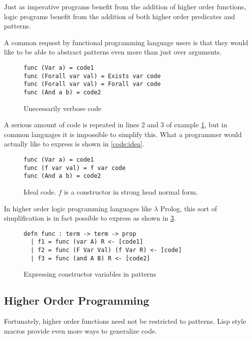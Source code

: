 Just as imperative programs benefit from the addition of higher order functions, logic programs benefit from the addition of both
higher order predicates and patterns.  

A common request by functional programming language users is that they would like to be able to abstract patterns even more than just over
arguments.  

\begin{figure}[h]
\begin{lstlisting}
func (Var a) = code1
func (Forall var val) = Exists var code
func (Forall var val) = Forall var code
func (And a b) = code2
\end{lstlisting}
\caption{Unecessarily verbose code}
\label{code:verbose}
\end{figure}

A serious amount of code is repeated in lines 2 and 3 of example \ref{code:verbose}, 
but in common languages it is impossible to simplify this.
What a programmer would actually like to express is shown in \ref{code:idea}.

\begin{figure}[h]
\begin{lstlisting}
func (Var a) = code1
func (f var val) = f var code
func (And a b) = code2
\end{lstlisting}
\caption{Ideal code. $f$ is a constructor in strong head normal form.}
\label{code:ideal}
\end{figure}

In higher order logic programming languages like $\lambda$ Prolog, this sort of simplification 
is in fact possible to express as shown in \ref{code:lprolog}.

\begin{figure}[h]
\begin{lstlisting}
defn func : term -> term -> prop 
  | f1 = func (var A) R <- [code1]
  | f2 = func (F Var Val) (f Var R) <- [code]
  | f3 = func (and A B) R <- [code2]
\end{lstlisting}
\caption{Expressing constructor variables in patterns}
\label{code:lprolog}
\end{figure}


\subsection{Higher Order Programming}

Fortunately, higher order functions need not be restricted to patterns.  Lisp style macros provide even more ways
to generalize code.  

